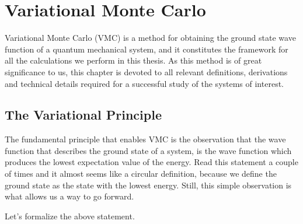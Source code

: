 \documentclass[Thesis.tex]{subfiles}
\begin{document}
\chapter{Variational Monte Carlo}

Variational Monte Carlo (VMC) is a method for obtaining the ground state wave function of
a quantum mechanical system, and it constitutes the framework for all the calculations we
perform in this thesis. As this method is of great significance to us, this chapter is
devoted to all relevant definitions, derivations and technical details required for a
successful study of the systems of interest.


\section{The Variational Principle}

The fundamental principle that enables VMC is the observation that the wave function that
describes the ground state of a system, is the wave function which produces the lowest
expectation value of the energy. Read this statement a couple of times and it almost seems
like a circular definition, because we define the ground state as the state with the
lowest energy. Still, this simple observation is what allows us a way to go forward.

Let's formalize the above statement.
\end{document}
